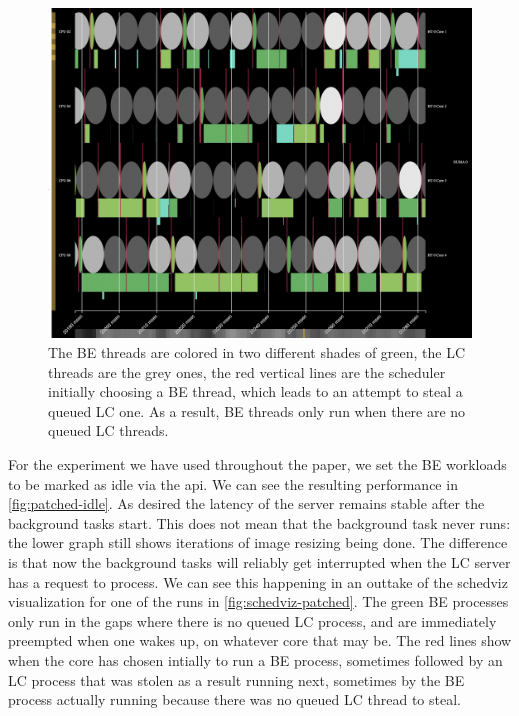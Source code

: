 \begin{figure}[t]
    \centering
    \includegraphics[width=\columnwidth]{graphs/schedviz-patched.png}
    \caption{The BE threads are colored in two different shades of green, the LC
    threads are the grey ones, the red vertical lines are the scheduler
    initially choosing a BE thread, which leads to an attempt to steal a queued
    LC one. As a result, BE threads only run when there are no queued LC
    threads.}\label{fig:schedviz-patched}
\end{figure}

For the experiment we have used throughout the paper, we set the BE workloads to
be marked as idle via the \cgroups{} api. We can see the resulting performance
in \autoref{fig:patched-idle}. As desired the latency of the server remains
stable after the background tasks start. This does not mean that the background
task never runs: the lower graph still shows iterations of image resizing being
done. The difference is that now the background tasks will reliably get
interrupted when the LC server has a request to process. We can see this
happening in an outtake of the schedviz visualization for one of the runs in
\autoref{fig:schedviz-patched}. The green BE processes only run in the gaps
where there is no queued LC process, and are immediately preempted when one
wakes up, on whatever core that may be. The red lines show when the core has
chosen intially to run a BE process, sometimes followed by an LC process that
was stolen as a result running next, sometimes by the BE process actually
running because there was no queued LC thread to steal.

